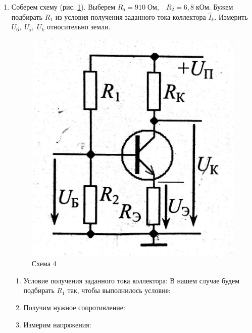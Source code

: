 \documentclass[a4paper]{article}
\begin{document}
\begin{enumerate}
\

    \item Соберем схему (рис. \ref{sch4}). Выберем $R_э = 910\; Ом, \;\;\;R_2 = 6,8\; кОм$. Бужем подбирать $R_1$ из условия получения заданного тока коллектора $\hat{I}_k$. Измерить $U_б, \; U_э, \; U_k$ относительно земли.

    \begin{figure}[H]
        \begin{center}
            \includegraphics[scale = 0.15]{4_1.jpg}
            \caption{Схема 4}
            \label{sch4}
        \end{center}
    \end{figure}

        \begin{enumerate}
            \item Условие получения заданного тока коллектора: 
            В нашем случае будем подбирать $R_1$ так, чтобы выполнилось условие:

            \item Получим нужное сопротивление:

            \item Измерим напряжения:
        \end{enumerate}


\end{enumerate}
\end{document}
